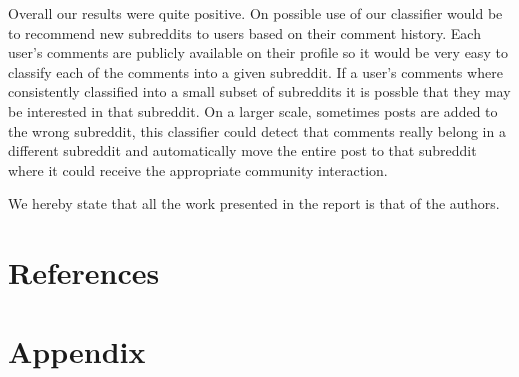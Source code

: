 \documentclass[10pt,twocolumn]{article}
\begin{document}
Overall our results were quite positive. On possible use of our classifier would be to recommend new subreddits to users based on their comment history. Each user's comments are publicly available on their profile so it would be very easy to classify each of the comments into a given subreddit. If a user's comments where consistently classified into a small subset of subreddits it is possble that they may be interested in that subreddit. On a larger scale, sometimes posts are added to the wrong subreddit, this classifier could detect that comments really belong in a different subreddit and automatically move the entire post to that subreddit where it could receive the appropriate community interaction.

We hereby state that all the work presented in the report is that of the authors.

\section{References}
\printbibliography
\section{Appendix}
\end{document}
